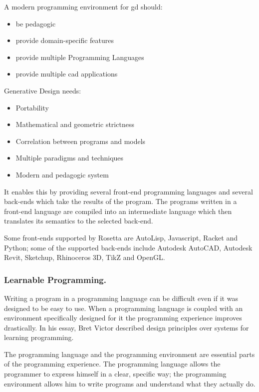 \documentclass{./llncs2e/llncs}
\begin{document}
	A modern programming environment for \ac{gd} should:
	\begin{itemize}
		\item be pedagogic
		\item provide domain-specific features
		\item provide multiple Programming Languages
		\item provide multiple \ac{cad} applications
	\end{itemize}
	
	Generative Design needs:
	\begin{itemize}
		\item Portability
		\item Mathematical and geometric strictness
		\item Correlation between programs and models
		\item Multiple paradigms and techniques
		\item Modern and pedagogic system
	\end{itemize}
	
	It enables this by providing several front-end programming languages and several back-ends which take the results of the program. 
	The programs written in a front-end language are compiled into an intermediate language which then translates its semantics to the selected back-end\cite{lopes2011portable}.
	
	Some front-ends supported by Rosetta are AutoLisp, Javascript, Racket and Python; some of the supported back-ends include Autodesk AutoCAD, Autodesk Revit, Sketchup, Rhinoceros 3D, TikZ and OpenGL.
	

\subsubsection{Learnable Programming.}
	Writing a program in a programming language can be difficult even if it was designed to be easy to use. 
	When a programming language is coupled with an environment specifically designed for it the programming experience improves drastically. 
	In his essay\cite{victor2012learnable}, Bret Victor described design principles over systems for learning programming.
	
	The programming language and the programming environment are essential parts of the programming experience.
	The programming language allows the programmer to express himself in a clear, specific way; the programming environment allows him to write programs and understand what they actually do.
	
\end{document}
